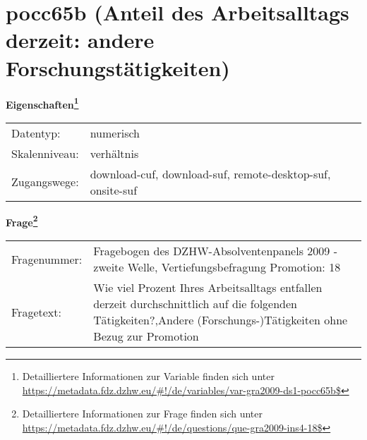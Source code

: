 
    \setcounter{footnote}{0}

    \vspace*{-1.8cm}
	\section{pocc65b (Anteil des Arbeitsalltags derzeit: andere Forschungstätigkeiten)}
	\label{section:pocc65b}



    \vspace*{0.5cm}
    \noindent\textbf{Eigenschaften\footnote{Detailliertere Informationen zur Variable finden sich unter
		\url{https://metadata.fdz.dzhw.eu/\#!/de/variables/var-gra2009-ds1-pocc65b$}}}\\
	\begin{tabularx}{\hsize}{@{}lX}
	Datentyp: & numerisch \\
	Skalenniveau: & verhältnis \\
	Zugangswege: &
	  download-cuf, 
	  download-suf, 
	  remote-desktop-suf, 
	  onsite-suf
 \\
    \end{tabularx}



				\vspace*{0.5cm}
                \noindent\textbf{Frage\footnote{Detailliertere Informationen zur Frage finden sich unter
		              \url{https://metadata.fdz.dzhw.eu/\#!/de/questions/que-gra2009-ins4-18$}}}\\
				\begin{tabularx}{\hsize}{@{}lX}
					Fragenummer: &
					  Fragebogen des DZHW-Absolventenpanels 2009 - zweite Welle, Vertiefungsbefragung Promotion:
					  18
 \\
					Fragetext: & Wie viel Prozent Ihres Arbeitsalltags entfallen derzeit durchschnittlich auf die folgenden Tätigkeiten?,Andere (Forschungs-)Tätigkeiten ohne Bezug zur Promotion \\
				\end{tabularx}





